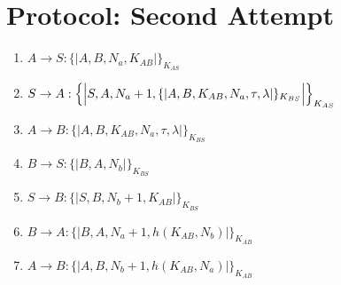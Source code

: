 \section{Protocol: Second Attempt}


\begin{enumerate}
    \item $ A \rightarrow S : \{|A, B, N_a, K_{AB}|\}_{K_{AS}}$
    \item $ S \rightarrow A : \Bigl\{\Bigl|S,A, N_a + 1, \{|A,B,K_{AB},N_a, \tau, \lambda |\}_{K_{BS}}\Bigr|\Bigr\}_{K_{AS}}$
    \item $ A \rightarrow B : \{|A,B,K_{AB},N_a, \tau, \lambda |\}_{K_{BS}}$
    \item $ B \rightarrow S : \{|B, A, N_b|\}_{K_{BS}}$
    \item $ S \rightarrow B : \{|S, B, N_b + 1, K_{AB}|\}_{K_{BS}}$
    \item $ B \rightarrow A : \{|B, A, N_a+1, h(K_{AB}, N_b)|\}_{K_{AB}}$
    \item $ A \rightarrow B : \{|A, B, N_b+1, h(K_{AB}, N_a)|\}_{K_{AB}}$

\end{enumerate}